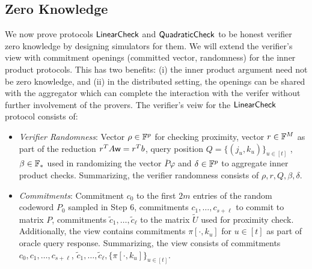 \subsection{Zero Knowledge}
We now prove protocols $\mathsf{LinearCheck}$ and $\mathsf{QuadraticCheck}$ to be honest verifier
zero knowledge by designing simulators for them. We will extend the verifier's
view with commitment openings (committed vector, randomness) for the inner
product protocols. This has two benefits: (i) the inner product argument need
not be zero knowledge, and (ii) in the distributed setting, the openings can be
shared with the aggregator which can complete the interaction with the verifer
without further involvement of the provers. The verifier's veiw for
the $\mathsf{LinearCheck}$ protocol consists of:
\begin{itemize}[\leftmargin=0pt]
\item {\em Verifier Randomness}: Vector $\rho \in \mathbb{F}^p$ for checking proximity,
vector $r\in \mathbb{F}^M$ as part of the reduction $r^TA\mathsf{w}=r^Tb$, query position $Q=
\{(j_u,k_u)\}_{u\in [t]}$ ,$\beta\in \mathbb{F}_\ast$ used in randomizing the vector
$\overline{P}\varphi$ and $\delta \in \mathbb{F}^p$ to aggregate inner product checks.
Summarizing, the verifier randomness consists of $\rho, r, Q, \beta, \delta$. %

\item {\em Commitments}: Commitment $c_0$ to the first $2m$ entries of the
random codeword $P_0$ sampled in Step 6, commitments $c_1,\ldots,c_{s+\ell}$ to
commit to matrix $P$, commitments $\tilde{c}_1,\ldots,\tilde{c}_{\ell}$ to the
matrix $\tilde{U}$ used for proximity check. 
Additionally, the view contains commitments $\pi[\cdot,k_u]$ for $u\in [t]$ as part of oracle query response. Summarizing, the view consists of commitments $c_0,c_1,\ldots,c_{s+\ell}$, $\tilde{c}_1, \ldots, \tilde{c}_{\ell} , \{\pi[\cdot,k_u]\}_{u\in [t]}$.


\end{itemize}
